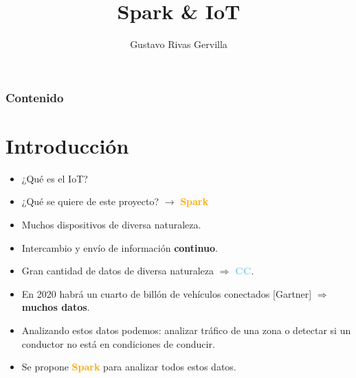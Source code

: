 \documentclass[dvipsnames]{beamer}
\date{} %
\author{Gustavo Rivas Gervilla}
\title{Spark \& IoT}
\begin{document}
	\begin{frame}[plain]
		\titlepage
	\end{frame}
		
	\begin{frame}
		\frametitle{Contenido}
		\tableofcontents
	\end{frame}
	
	\AtBeginSection[]{
		\begin{frame}
			\frametitle{Contenido}
			\tableofcontents[currentsection]
		\end{frame}
	}
	
	\section{Introducción}
	
	\begin{frame}
		\begin{itemize}
			\item ¿Qué es el IoT?
			\item ¿Qué se quiere de este proyecto? $\longrightarrow$ \textcolor{orange}{\textbf{Spark}}
		\end{itemize}		
	\end{frame}

        \begin{frame}
          \begin{itemize}
          \item Muchos dispositivos de diversa naturaleza.
          \item Intercambio y envío de información \textbf{continuo}.
          \item \textcolor{deepRed}{Gran cantidad} de datos de diversa naturaleza $\Rightarrow$ \textcolor{SkyBlue}{\textbf{CC}}. 
          \end{itemize}
        \end{frame}

        \begin{frame}
          \begin{itemize}
          \item En 2020 habrá un cuarto de billón de vehículos conectados [Gartner] $\Rightarrow$ \textbf{muchos datos}.
          \item Analizando estos datos podemos: analizar tráfico de una zona o detectar si un conductor no está en condiciones de conducir.
          \item Se propone \textcolor{orange}{\textbf{Spark}} para analizar todos estos datos.
          \end{itemize}
        \end{frame}
\end{document}
